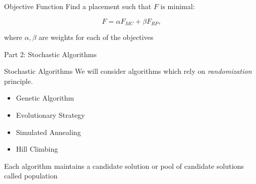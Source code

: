 \documentclass{beamer}
\begin{document}
\begin{frame}{Objective Function}
    Find a placement such that $F$ is minimal:
    \begin{tcolorbox}[colback=green!5]
        \begin{equation} \label{eq:optimal}
            F = \alpha F_{MC} + \beta F_{RP},
        \end{equation}
    \end{tcolorbox}
    where $\alpha, \beta$ are weights for each of the objectives 
\end{frame}

\begin{frame}{\null}
    \begin{tcolorbox}[colback=green!5]
        \centering\Huge
        Part 2: Stochastic Algorithms
    \end{tcolorbox}
\end{frame}
\begin{frame}[t]{Stochastic Algorithms}
    We will consider algorithms which rely on \textit{randomization} principle.
    \vspace{10px}
\begin{itemize} \itemsep1.5em
        \item Genetic Algorithm
        \item Evolutionary Strategy
        \item Simulated Annealing
        \item Hill Climbing
    \end{itemize}
    \vspace{5mm}
    Each algorithm maintains a candidate solution or pool of candidate solutions called population
\end{frame}
\end{document}

